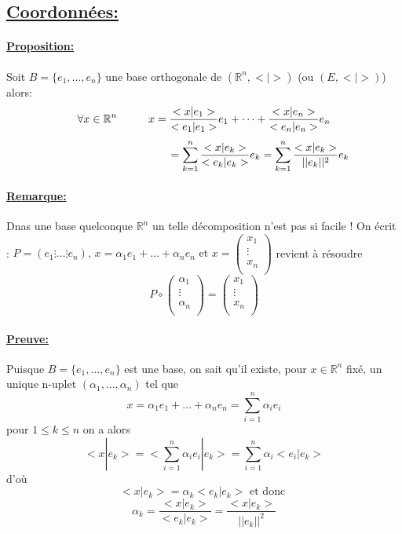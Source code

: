 \documentclass{article}
\newcommand\tab[1][1cm]{\hspace*{#1}}
\begin{document}
\subsection{\underline{Coordonnées:}}

\paragraph{\underline{Proposition:}} Soit $B = \{e_1, \dots, e_n\}$ une base orthogonale
de $(\mathbb{R}^n, <|>)$ (ou $(E, <|>)$) alors:
$$\forall x \in \mathbb{R}^n \tab x = \frac{<x|e_1>}{<e_1|e_1>}e_1 + \dots + \frac{<x|e_n>}{<e_n|e_n>}e_n$$
$$\tab[3.6cm] = \sum_{k=1}^n \frac{<x|e_k>}{<e_k|e_k>}e_k = \sum_{k=1}^n \frac{<x|e_k>}{||e_k||^2}e_k$$

\paragraph{\underline{Remarque:}} Dnas une base quelconque $\mathbb{R}^n$ un telle décomposition n'est pas si facile ! On écrit :
$P = (e_1 \vdots \dots \vdots e_n)
\mbox{, } x = \alpha_1 e_1 + \dots + \alpha_n e_n
\mbox{ et } x =
\begin{pmatrix}
    x_1 \\
    \vdots \\
    x_n \\    
\end{pmatrix}
$ revient à résoudre $$P \circ \begin{pmatrix}
    \alpha_1 \\
    \vdots \\
    \alpha_n \\
\end{pmatrix} = \begin{pmatrix}
    x_1 \\
    \vdots \\
    x_n \\
\end{pmatrix}$$

\paragraph{\underline{Preuve:}} Puisque $B = \{e_1, \dots, e_n\}$ est une base, on sait qu'il
existe, pour $x \in \mathbb{R}^n$ fixé, un unique n-uplet $(\alpha_1, \dots, \alpha_n)$ tel que
$$x = \alpha_1 e_1 + \dots + \alpha_n e_n = \sum_{i = 1}^n \alpha_i e_i$$
pour $1 \leq k \leq n$ on a alors
$$<x | e_k> = <\sum_{i=1}^n \alpha_i e_i | e_k > = \sum_{i=1}^n \alpha_i <e_i | e_k>$$
d'où
$$<x | e_k> = \alpha_k <e_k | e_k> \mbox{ et donc }$$
$$\alpha_k = \frac{<x|e_k>}{<e_k|e_k>} = \frac{<x|e_k>}{||e_k||^2}$$
\end{document}
